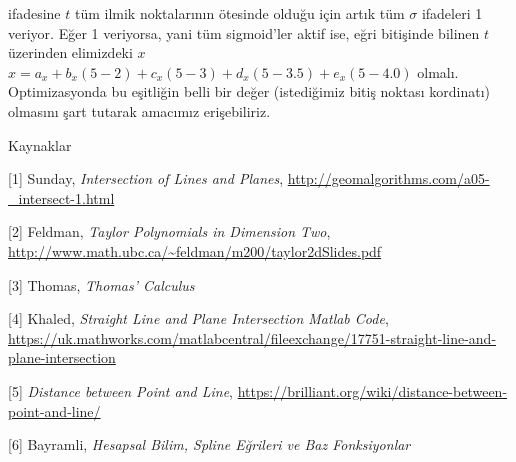 \documentclass[12pt,fleqn]{article}\usepackage{../../common}
\begin{document}
ifadesine $t$ tüm ilmik noktalarının ötesinde olduğu için artık tüm
$\sigma$ ifadeleri 1 veriyor. Eğer 1 veriyorsa, yani tüm sigmoid'ler aktif
ise, eğri bitişinde bilinen $t$ üzerinden elimizdeki $x$ 
$x = a_x + b_x(5-2) + c_x(5-3) + d_x(5-3.5) + e_x(5-4.0)$
olmalı. Optimizasyonda bu eşitliğin belli bir değer (istediğimiz bitiş
noktası kordinatı) olmasını şart tutarak amacımız erişebiliriz.

Kaynaklar

[1] Sunday, {\em Intersection of Lines and Planes}, 
\url{http://geomalgorithms.com/a05-_intersect-1.html}

[2] Feldman, {\em Taylor Polynomials in Dimension Two},
\url{http://www.math.ubc.ca/~feldman/m200/taylor2dSlides.pdf}

[3] Thomas, {\em Thomas' Calculus}

[4] Khaled, {\em Straight Line and Plane Intersection Matlab Code}, 
\url{https://uk.mathworks.com/matlabcentral/fileexchange/17751-straight-line-and-plane-intersection}

[5] {\em Distance between Point and Line}, 
\url{https://brilliant.org/wiki/distance-between-point-and-line/}

[6] Bayramli, {\em Hesapsal Bilim, Spline Eğrileri ve Baz Fonksiyonlar}
\end{document}
